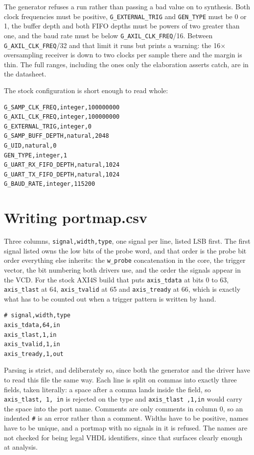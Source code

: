 \documentclass[../manual.tex]{subfiles}
\begin{document}
The generator refuses a run rather than passing a bad value on to synthesis. Both clock frequencies must be positive, \texttt{G\_EXTERNAL\_TRIG} and \texttt{GEN\_TYPE} must be 0 or 1, the buffer depth and both FIFO depths must be powers of two greater than one, and the baud rate must be below \texttt{G\_AXIL\_CLK\_FREQ}/16. Between \texttt{G\_AXIL\_CLK\_FREQ}/32 and that limit it runs but prints a warning: the 16$\times$ oversampling receiver is down to two clocks per sample there and the margin is thin. The full ranges, including the ones only the elaboration asserts catch, are in the datasheet.

The stock configuration is short enough to read whole:

\begin{lstlisting}
G_SAMP_CLK_FREQ,integer,100000000
G_AXIL_CLK_FREQ,integer,100000000
G_EXTERNAL_TRIG,integer,0
G_SAMP_BUFF_DEPTH,natural,2048
G_UID,natural,0
GEN_TYPE,integer,1
G_UART_RX_FIFO_DEPTH,natural,1024
G_UART_TX_FIFO_DEPTH,natural,1024
G_BAUD_RATE,integer,115200
\end{lstlisting}

\section{Writing portmap.csv}
\label{sec:codegen_portmap}

Three columns, \texttt{signal,width,type}, one signal per line, listed LSB first. The first signal listed owns the low bits of the probe word, and that order is the probe bit order everything else inherits: the \texttt{w\_probe} concatenation in the core, the trigger vector, the bit numbering both drivers use, and the order the signals appear in the VCD. For the stock AXI4S build that puts \texttt{axis\_tdata} at bits 0 to 63, \texttt{axis\_tlast} at 64, \texttt{axis\_tvalid} at 65 and \texttt{axis\_tready} at 66, which is exactly what has to be counted out when a trigger pattern is written by hand.

\begin{lstlisting}
# signal,width,type
axis_tdata,64,in
axis_tlast,1,in
axis_tvalid,1,in
axis_tready,1,out
\end{lstlisting}

Parsing is strict, and deliberately so, since both the generator and the driver have to read this file the same way. Each line is split on commas into exactly three fields, taken literally: a space after a comma lands inside the field, so \texttt{axis\_tlast, 1, in} is rejected on the type and \texttt{axis\_tlast ,1,in} would carry the space into the port name. Comments are only comments in column 0, so an indented \texttt{\#} is an error rather than a comment. Widths have to be positive, names have to be unique, and a portmap with no signals in it is refused. The names are not checked for being legal VHDL identifiers, since that surfaces clearly enough at analysis.
\end{document}
